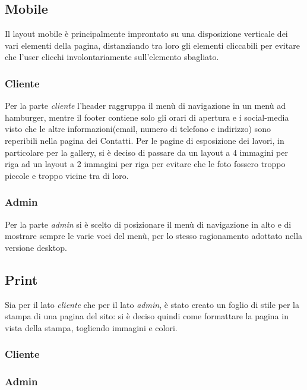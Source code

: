 \subsection{Mobile}
Il layout mobile è principalmente improntato su una disposizione verticale dei vari elementi della pagina, distanziando tra loro gli elementi cliccabili per evitare che l'user clicchi involontariamente sull'elemento sbagliato. 
\subsubsection{Cliente}
Per la parte \textit{cliente} l'header raggruppa il menù di navigazione in un menù ad hamburger, mentre il footer contiene solo gli orari di apertura e i social-media visto che le altre informazioni(email, numero di telefono e indirizzo) sono reperibili nella pagina dei Contatti. Per le pagine di esposizione dei lavori, in particolare per la gallery, si è deciso di passare da un layout a 4 immagini per riga ad un layout a 2 immagini per riga per evitare che le foto fossero troppo piccole e troppo vicine tra di loro.
\subsubsection{Admin}
Per la parte \textit{admin} si è scelto di posizionare il menù di navigazione in alto e di mostrare sempre le varie voci del menù, per lo stesso ragionamento adottato nella versione desktop.

\subsection{Print}
Sia per il lato \textit{cliente} che per il lato \textit{admin}, è stato creato un foglio di stile per la stampa di una pagina del sito: si è deciso quindi come formattare la pagina in vista della stampa, togliendo immagini e colori.
\subsubsection{Cliente}


\subsubsection{Admin}


